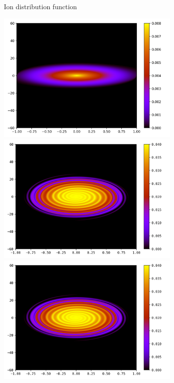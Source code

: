 \documentclass{article}
\numberwithin{equation}{section}
\newcommand{\imh}{\textheight} %
\newcommand{\imw}{\textwidth} %
\begin{document}
\begin{figure}
\begin{subfigure}{\textwidth}
		\caption{Ion distribution function}
		\label{subfig:compT02_ion}
	\end{subfigure}
	\begin{subfigure}{\textwidth}
		\centering
		\includegraphics[height=\imh,width=\imw]{images/feT20_FD.png}
		\includegraphics[height=\imh,width=\imw]{images/feT20_512.png}
		\includegraphics[height=\imh,width=\imw]{images/feT20_512_3.png}

\end{subfigure}
\end{figure}
\end{document}
